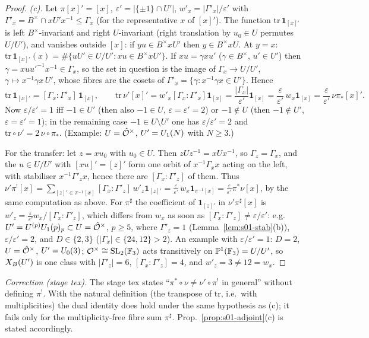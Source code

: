 \begin{proof}
\emph{(c).} Let $\pi[x]'=[x]$, $\varepsilon'=|\{\pm1\}\cap U'|$, $w'_x=|\Gamma'_x|/\varepsilon'$ with $\Gamma'_x=B^\times\cap xU'x^{-1}\le\Gamma_x$ (for the representative $x$ of $[x]'$).
The function $\mathrm{tr}\,\mathbf 1_{[x]'}$ is left $B^\times$-invariant and right $U$-invariant (right translation by $u_0\in U$ permutes $U/U'$), and vanishes outside $[x]$: if $yu\in B^\times xU'$ then $y\in B^\times xU$.
At $y=x$: $\mathrm{tr}\,\mathbf 1_{[x]'}(x)=\#\{uU'\in U/U':xu\in B^\times xU'\}$. If $xu=\gamma xu'$ ($\gamma\in B^\times$, $u'\in U'$) then $\gamma=xuu'^{-1}x^{-1}\in\Gamma_x$,
so the set in question is the image of $\Gamma_x\to U/U'$, $\gamma\mapsto x^{-1}\gamma x\,U'$, whose fibres are the cosets of $\Gamma'_x=\{\gamma:x^{-1}\gamma x\in U'\}$. Hence
\[\mathrm{tr}\,\mathbf 1_{[x]'}=[\Gamma_x:\Gamma'_x]\,\mathbf 1_{[x]},\qquad
\mathrm{tr}\,\nu'[x]'=w'_x[\Gamma_x:\Gamma'_x]\mathbf 1_{[x]}=\frac{|\Gamma_x|}{\varepsilon'}\mathbf 1_{[x]}=\frac{\varepsilon}{\varepsilon'}\,w_x\mathbf 1_{[x]}=\frac{\varepsilon}{\varepsilon'}\,\nu\pi_*[x]'.\]
Now $\varepsilon/\varepsilon'=1$ iff $-1\in U'$ (then also $-1\in U$, $\varepsilon=\varepsilon'=2$) or $-1\notin U$ (then $-1\notin U'$, $\varepsilon=\varepsilon'=1$); in the remaining case $-1\in U\setminus U'$
one has $\varepsilon/\varepsilon'=2$ and $\mathrm{tr}\circ\nu'=2\,\nu\circ\pi_*$. (Example: $U=\hat{\mathcal{O}}^\times$, $U'=U_1(N)$ with $N\ge3$.)

For the transfer: let $z=xu_0$ with $u_0\in U$. Then $zUz^{-1}=xUx^{-1}$, so $\Gamma_z=\Gamma_x$, and the $u\in U/U'$ with $[xu]'=[z]'$ form one orbit of $x^{-1}\Gamma_xx$ acting on the left, with stabiliser
$x^{-1}\Gamma'_zx$, hence there are $[\Gamma_x:\Gamma'_z]$ of them. Thus $\nu'\pi^![x]=\sum_{[z]'\in\pi^{-1}[x]}[\Gamma_x:\Gamma'_z]\,w'_z\mathbf 1_{[z]'}=\frac{\varepsilon}{\varepsilon'}\,w_x\mathbf 1_{\pi^{-1}[x]}=\frac{\varepsilon}{\varepsilon'}\pi^*\nu[x]$,
by the same computation as above. For $\pi^\sharp$ the coefficient of $\mathbf 1_{[z]'}$ in $\nu'\pi^\sharp[x]$ is $w'_z=\frac{\varepsilon}{\varepsilon'}w_x/[\Gamma_x:\Gamma'_z]$, which differs from $w_x$ as soon as $[\Gamma_x:\Gamma'_z]\ne\varepsilon/\varepsilon'$:
e.g.\ $U'=U^{(p)}U_1(p)_p\subset U=\hat{\mathcal{O}}^\times$, $p\ge5$, where $\Gamma'_z=1$ (Lemma~\ref{lem:s01-stab}(b)), $\varepsilon/\varepsilon'=2$, and $D\in\{2,3\}$ ($|\Gamma_x|\in\{24,12\}>2$).
An example with $\varepsilon/\varepsilon'=1$: $D=2$, $U=\hat{\mathcal{O}}^\times$, $U'=U_0(3)$; $\mathcal{O}^\times\cong\mathrm{SL}_2(\mathbb{F}_3)$ acts transitively on $\mathbb P^1(\mathbb{F}_3)=U/U'$, so $X_B(U')$ is one class with $|\Gamma'_z|=6$, $[\Gamma_x:\Gamma'_z]=4$, and $w'_z=3\ne12=w_x$.
\end{proof}
\noindent\emph{Correction (stage tex).} The stage tex states ``$\pi^*\circ\nu\ne\nu'\circ\pi^!$ in general'' without defining $\pi^!$. With the natural definition (the transpose of $\mathrm{tr}$, i.e.\ with multiplicities)
the dual identity does hold under the same hypothesis as (c); it fails only for the multiplicity-free fibre sum $\pi^\sharp$. Prop.~\ref{prop:s01-adjoint}(c) is stated accordingly.

